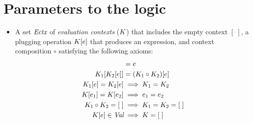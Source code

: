 
\section{Parameters to the logic}

\begin{itemize}
\item A set $\textit{Ectx}$ of \emph{evaluation contexts} ($K$) that includes the empty context $[\; ]$,
  a plugging operation $K[e]$ that produces an expression, and context composition $\circ$
  satisfying the following axioms:
  \begin{align*}
    [\; ][ \expr ] &= \expr \\
    \ectx_1[\ectx_2[\expr]] &= (\ectx_1 \circ \ectx_2) [\expr] \\
    \ectx_1[\expr] = \ectx_2[\expr] &\implies \ectx_1 = \ectx_2 \\
    \ectx[\expr_1] = \ectx[\expr_2] &\implies \expr_1 = \expr_2 \\
    \ectx_1 \circ \ectx_2 = [\; ] &\implies \ectx_1 = \ectx_2 = [\; ] \\
    \ectx[\expr] \in \textdom{Val} &\implies \ectx = [\;] \\
  \end{align*}


\end{itemize}
